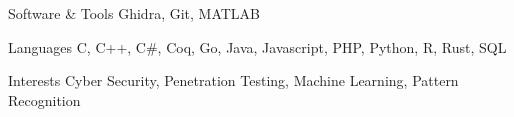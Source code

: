
\begin{cvskills}
  \cvskill
    {Software \& Tools}
    {Ghidra, Git, MATLAB}

  \cvskill
    {Languages}
    {C, C++, C\#, Coq, Go, Java, Javascript, PHP, Python, R, Rust, SQL}

  \cvskill
    {Interests}
    {Cyber Security, Penetration Testing, Machine Learning, Pattern Recognition}
\end{cvskills}
